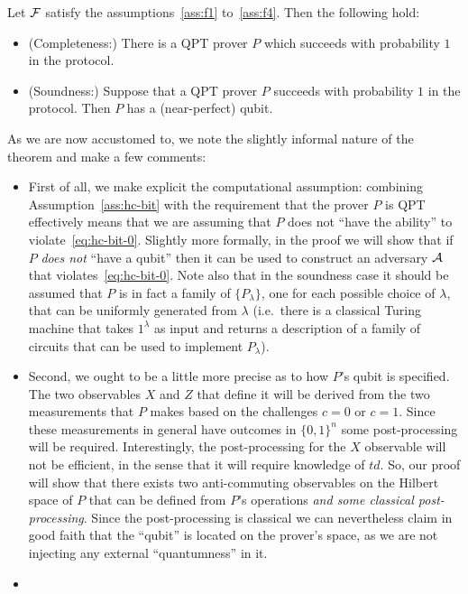\begin{theorem}\label{thm:comp-qubit}
Let $\mathcal{F}$ satisfy the assumptions~\ref{ass:f1} to~\ref{ass:f4}. Then the following hold:
\begin{itemize}
\item (Completeness:) There is a QPT prover $P$ which succeeds with probability $1$ in the protocol.
\item (Soundness:) Suppose that a QPT prover $P$ succeeds with probability $1$ in the protocol. Then $P$ has a (near-perfect) qubit. 
\end{itemize}
\end{theorem}

As we are now accustomed to, we note the slightly informal nature of the theorem and make a few comments:
\begin{itemize}
\item First of all, we make explicit the computational assumption: combining Assumption~\ref{ass:hc-bit} with the requirement that the prover $P$ is QPT effectively means that we are assuming that $P$ does not ``have the ability'' to violate~\eqref{eq:hc-bit-0}. Slightly more formally, in the proof we will show that if $P$ \emph{does not} ``have a qubit'' then it can be used to construct an adversary $\mathcal{A}$ that violates~\eqref{eq:hc-bit-0}. Note also that in the soundness case it should be assumed that $P$ is in fact a family of $\{P_\lambda\}$, one for each possible choice of $\lambda$, that can be uniformly generated from $\lambda$ (i.e.\ there is a classical Turing machine that takes $1^\lambda$ as input and returns a description of a family of circuits that can be used to implement $P_\lambda$). 
\item
Second, we ought to be a little more precise as to how $P$'s qubit is specified. The two observables $X$ and $Z$ that define it will be derived from the two measurements that $P$ makes based on the challenges $c=0$ or $c=1$. Since these measurements in general have outcomes in $\{0,1\}^n$ some post-processing will be required. Interestingly, the post-processing for the $X$ observable will not be efficient, in the sense that it will require knowledge of $td$. So, our proof will show that there exists two anti-commuting observables on the Hilbert space of $P$ that can be defined from $P$'s operations \emph{and some classical post-processing}. Since the post-processing is classical we can nevertheless claim in good faith that the ``qubit'' is located on the prover's space, as we are not injecting any external ``quantumness'' in it. 
\item

\end{itemize}
